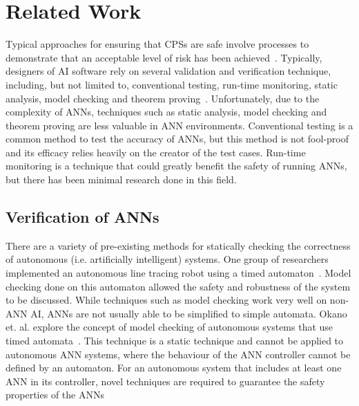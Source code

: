\section{Related Work}
\label{sec:related}
Typical approaches for ensuring that \acp{CPS} are safe involve processes to demonstrate that an acceptable level of risk has been achieved~\cite{scann}. 
Typically, designers of \ac{AI} software rely on several validation and verification technique, including, but not limited to, conventional testing, run-time monitoring, static analysis, model checking and theorem proving~\cite{menzies2005verification}.
Unfortunately, due to the complexity of \acfp{ANN}, techniques such as static analysis, model checking and theorem proving are less valuable in \ac{ANN} environments. 
Conventional testing is a common method to test the accuracy of \acp{ANN}, but this method is not fool-proof and its efficacy relies heavily on the creator of the test cases.
Run-time monitoring is a technique that could greatly benefit the safety of running \acp{ANN}, but there has been minimal research done in this field.


\subsection{Verification of \acp{ANN}}
There are a variety of pre-existing methods for statically checking the correctness of autonomous (i.e. artificially intelligent) systems.
One group of researchers implemented an autonomous line tracing robot using a timed automaton~\cite{timed-enf-autonomous}.
Model checking done on this automaton allowed the safety and robustness of the system to be discussed.
While techniques such as model checking work very well on non-\ac{ANN} \ac{AI}, \acp{ANN} are not usually able to be simplified to simple automata.
Okano et. al. explore the concept of model checking of autonomous systems that use timed automata~\cite{timed-enf-autonomous}. 
This technique is a static technique and cannot be applied to autonomous \ac{ANN} systems, where the behaviour of the \ac{ANN} controller cannot be defined by an automaton.
For an autonomous system that includes at least one \ac{ANN} in its controller, novel techniques are required to guarantee the safety properties of the \acp{ANN}

